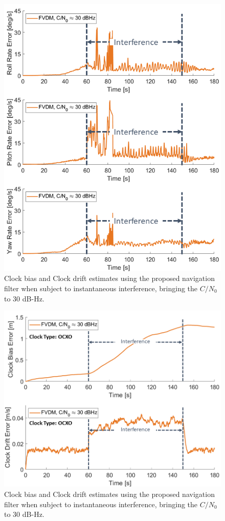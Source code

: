 \documentclass[12pt]{report}
\begin{document}
\begin{figure}[!ht]
  \centering
  \includegraphics[width=0.75\linewidth]{Figures/Results/trajectoryfigure/Slide11.PNG}
  \caption{Clock bias and Clock drift estimates using the proposed navigation filter when subject to instantaneous interference, bringing the \(C/N_0\) to \(30\) dB-Hz.}\label{fig:Ang30}
\end{figure}


\begin{figure}[!ht]
  \centering
  \includegraphics[width=0.75\linewidth]{Figures/Results/trajectoryfigure/Slide23.PNG}
  \caption{Clock bias and Clock drift estimates using the proposed navigation filter when subject to instantaneous interference, bringing the \(C/N_0\) to \(30\) dB-Hz.}\label{fig:Clk30}
\end{figure}
\end{document}
